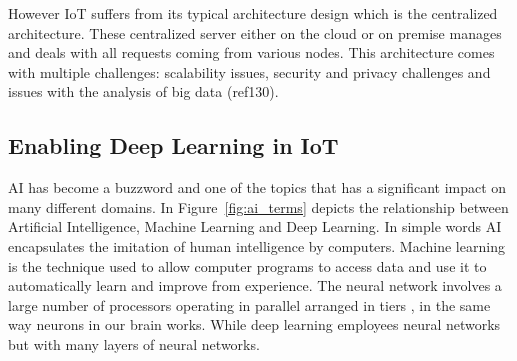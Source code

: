 However IoT suffers from its typical architecture design which is the centralized architecture. These centralized server either on the cloud or on premise manages and deals with all requests coming from various nodes. This architecture comes with multiple challenges: scalability issues, security and privacy challenges and issues with the analysis of big data (ref130). 

\subsection{Enabling Deep Learning in IoT}
AI has become a buzzword and one of the topics that has a significant impact on many different domains. In Figure~\ref{fig:ai_terms} depicts the relationship between Artificial Intelligence, Machine Learning and Deep Learning. In simple words AI encapsulates the imitation of human intelligence by computers. Machine learning is the technique used to allow computer programs to access data and use it to automatically learn and improve from experience. The neural network involves a large number of processors operating in parallel arranged in tiers , in the same way neurons in our brain works. While deep learning employees neural networks but with many layers of neural networks. 


